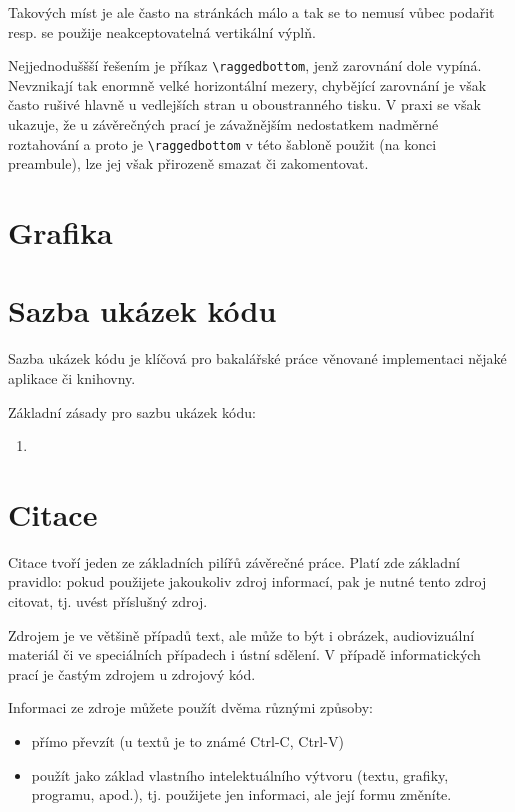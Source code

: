 \documentclass[male,czech,api_bc]{kitheses}
\begin{document}
Takových míst je ale často na stránkách málo a tak se to nemusí vůbec podařit resp. se použije neakceptovatelná vertikální výplň. 

Nejjednoduššší řešením je příkaz \verb!\raggedbottom!, jenž zarovnání dole vypíná. Nevznikají tak enormně velké horizontální mezery, chybějící zarovnání je však často rušivé hlavně u vedlejších
stran u oboustranného tisku. V praxi se však ukazuje, že u závěrečných prací  je závažnějším nedostatkem nadměrné roztahování a proto je \verb!\raggedbottom! v této šabloně použit (na konci preambule), lze jej však přirozeně smazat či zakomentovat.


\chapter{Grafika}

\chapter{Sazba ukázek kódu}

Sazba ukázek kódu je klíčová pro bakalářské práce věnované implementaci nějaké aplikace či knihovny.

Základní zásady pro sazbu ukázek kódu:

\begin{enumerate}
\item 
\end{enumerate}

\chapter{Citace}

Citace tvoří jeden ze základních pilířů závěrečné práce. Platí zde základní pravidlo: pokud použijete 
jakoukoliv zdroj informací, pak je nutné tento zdroj citovat, tj. uvést příslušný zdroj.

Zdrojem je ve většině případů text, ale může to být i obrázek, audiovizuální materiál či ve speciálních případech i ústní sdělení. V případě informatických prací je častým zdrojem u zdrojový kód.

Informaci ze zdroje můžete použít dvěma různými způsoby:

\begin{itemize}
\item přímo převzít (u textů je to známé Ctrl-C, Ctrl-V)
\item použít jako základ vlastního intelektuálního výtvoru (textu, grafiky, programu, apod.), tj. použijete jen informaci, ale její formu změníte.
\end{itemize}
\end{document}
